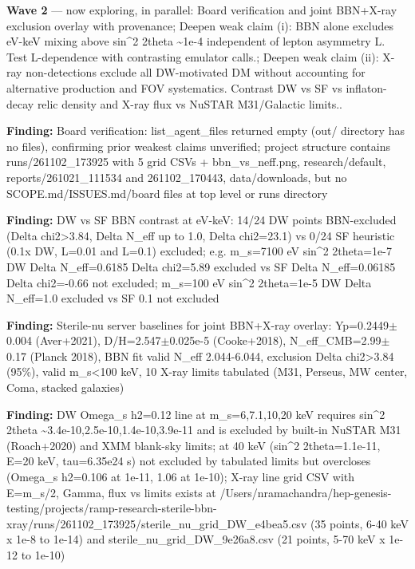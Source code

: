 \documentclass[11pt,a4paper]{article}
\begin{document}
\textbf{Wave 2} --- now exploring, in parallel: Board verification and joint BBN+X-ray exclusion overlay with provenance; Deepen weak claim (i): BBN alone excludes eV-keV mixing above sin\textasciicircum{}2 2theta \textasciitilde{}1e-4 independent of lepton asymmetry L. Test L-dependence with contrasting emulator calls.; Deepen weak claim (ii): X-ray non-detections exclude all DW-motivated DM without accounting for alternative production and FOV systematics. Contrast DW vs SF vs inflaton-decay relic density and X-ray flux vs NuSTAR M31/Galactic limits..

\textbf{Finding:} Board verification: list\_agent\_files returned empty (out/ directory has no files), confirming prior weakest claims unverified; project structure contains runs/261102\_173925 with 5 grid CSVs + bbn\_vs\_neff.png, research/default, reports/261021\_111534 and 261102\_170443, data/downloads, but no SCOPE.md/ISSUES.md/board files at top level or runs directory

\textbf{Finding:} DW vs SF BBN contrast at eV-keV: 14/24 DW points BBN-excluded (Delta chi2\textgreater{}3.84, Delta N\_eff up to 1.0, Delta chi2=23.1) vs 0/24 SF heuristic (0.1x DW, L=0.01 and L=0.1) excluded; e.g. m\_s=7100 eV sin\textasciicircum{}2 2theta=1e-7 DW Delta N\_eff=0.6185 Delta chi2=5.89 excluded vs SF Delta N\_eff=0.06185 Delta chi2=-0.66 not excluded; m\_s=100 eV sin\textasciicircum{}2 2theta=1e-5 DW Delta N\_eff=1.0 excluded vs SF 0.1 not excluded

\textbf{Finding:} Sterile-nu server baselines for joint BBN+X-ray overlay: Yp=0.2449$\pm$0.004 (Aver+2021), D/H=2.547$\pm$0.025e-5 (Cooke+2018), N\_eff\_CMB=2.99$\pm$0.17 (Planck 2018), BBN fit valid N\_eff 2.044-6.044, exclusion Delta chi2\textgreater{}3.84 (95\%), valid m\_s\textless{}100 keV, 10 X-ray limits tabulated (M31, Perseus, MW center, Coma, stacked galaxies)

\textbf{Finding:} DW Omega\_s h2=0.12 line at m\_s=6,7.1,10,20 keV requires sin\textasciicircum{}2 2theta \textasciitilde{}3.4e-10,2.5e-10,1.4e-10,3.9e-11 and is excluded by built-in NuSTAR M31 (Roach+2020) and XMM blank-sky limits; at 40 keV (sin\textasciicircum{}2 2theta=1.1e-11, E=20 keV, tau=6.35e24 s) not excluded by tabulated limits but overcloses (Omega\_s h2=0.106 at 1e-11, 1.06 at 1e-10); X-ray line grid CSV with E=m\_s/2, Gamma, flux vs limits exists at /Users/nramachandra/hep-genesis-testing/projects/ramp-research-sterile-bbn-xray/runs/261102\_173925/sterile\_nu\_grid\_DW\_e4bea5.csv (35 points, 6-40 keV x 1e-8 to 1e-14) and sterile\_nu\_grid\_DW\_9e26a8.csv (21 points, 5-70 keV x 1e-12 to 1e-10)
\end{document}

